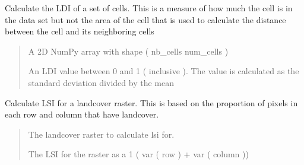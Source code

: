\documentclass[letterpaper,10pt,english]{article}
\begin{document}
\begin{fulllineitems}
\label{\detokenize{indexes_func:indexes_func.calc_ldi}}
\pysigstartsignatures
{}
\pysigstopsignatures
\sphinxAtStartPar
Calculate the LDI of a set of cells. This is a measure of how much the cell is in the data set but not the area of the cell that is used to calculate the distance between the cell and its neighboring cells
\begin{quote}\begin{description}
\sphinxAtStartPar
{} \textendash{} A 2D NumPy array with shape ( nb\_cells num\_cells )

\sphinxAtStartPar
An LDI value between 0 and 1 ( inclusive ). The value is calculated as the standard deviation divided by the mean

\end{description}\end{quote}

\end{fulllineitems}


\begin{fulllineitems}
\label{\detokenize{indexes_func:indexes_func.calc_lsi}}
\pysigstartsignatures
{}
\pysigstopsignatures
\sphinxAtStartPar
Calculate LSI for a landcover raster. This is based on the proportion of pixels in each row and column that have landcover.
\begin{quote}\begin{description}
\sphinxAtStartPar
{} \textendash{} The landcover raster to calculate lsi for.

\sphinxAtStartPar
The LSI for the raster as a 1 \sphinxhyphen{} ( var ( row ) + var ( column ))

\end{description}\end{quote}

\end{fulllineitems}
\end{document}
